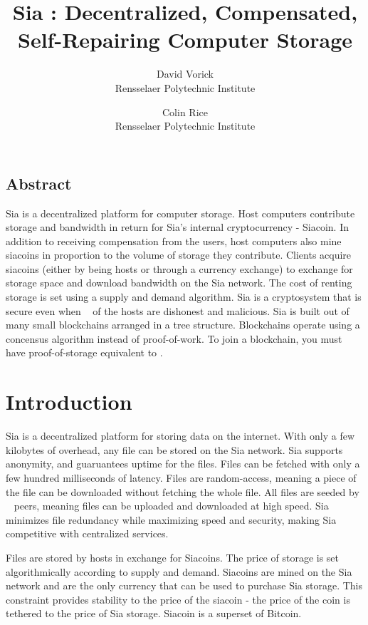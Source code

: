 \documentclass[twocolumn]{article}
\begin{document}
\title{Sia : Decentralized, Compensated, Self-Repairing Computer Storage}

\author{
{\rm David Vorick}\\
Rensselaer Polytechnic Institute
\and
{\rm Colin Rice}\\
Rensselaer Polytechnic Institute
}

\maketitle

\subsection*{Abstract}
Sia is a decentralized platform for computer storage.
Host computers contribute storage and bandwidth in return for Sia's internal cryptocurrency - Siacoin.
In addition to receiving compensation from the users, host computers also mine siacoins in proportion to the volume of storage they contribute.
Clients acquire siacoins (either by being hosts or through a currency exchange) to exchange for storage space and download bandwidth on the Sia network.
The cost of renting storage is set using a supply and demand algorithm.
Sia is a cryptosystem that is secure even when \fortynine ~ of the hosts are dishonest and malicious.
Sia is built out of many small blockchains arranged in a tree structure.
Blockchains operate using a concensus algorithm instead of proof-of-work.
To join a blockchain, you must have proof-of-storage equivalent to \storageperhost.

\section{Introduction}

Sia is a decentralized platform for storing data on the internet.
With only a few kilobytes of overhead, any file can be stored on the Sia network.
Sia supports anonymity, and guaruantees uptime for the files.
Files can be fetched with only a few hundred milliseconds of latency.
Files are random-access, meaning a piece of the file can be downloaded without fetching the whole file.
All files are seeded by \numhosts ~ peers, meaning files can be uploaded and downloaded at high speed.
Sia minimizes file redundancy while maximizing speed and security, making Sia competitive with centralized services.

Files are stored by hosts in exchange for Siacoins.
The price of storage is set algorithmically according to supply and demand.
Siacoins are mined on the Sia network and are the only currency that can be used to purchase Sia storage.
This constraint provides stability to the price of the siacoin - the price of the coin is tethered to the price of Sia storage.
Siacoin is a superset of Bitcoin.
\end{document}
